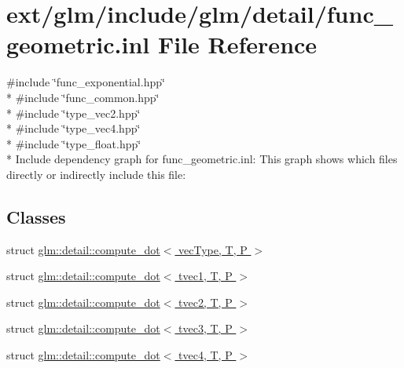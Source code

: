 \hypertarget{func__geometric_8inl}{\section{ext/glm/include/glm/detail/func\-\_\-geometric.inl File Reference}
\label{func__geometric_8inl}
}
{\ttfamily \#include \char`\"{}func\-\_\-exponential.\-hpp\char`\"{}}\\*
{\ttfamily \#include \char`\"{}func\-\_\-common.\-hpp\char`\"{}}\\*
{\ttfamily \#include \char`\"{}type\-\_\-vec2.\-hpp\char`\"{}}\\*
{\ttfamily \#include \char`\"{}type\-\_\-vec4.\-hpp\char`\"{}}\\*
{\ttfamily \#include \char`\"{}type\-\_\-float.\-hpp\char`\"{}}\\*
Include dependency graph for func\-\_\-geometric.\-inl\-:
This graph shows which files directly or indirectly include this file\-:
\subsection*{Classes}
\begin{DoxyCompactItemize}
\item 
struct \hyperlink{structglm_1_1detail_1_1compute__dot}{glm\-::detail\-::compute\-\_\-dot$<$ vec\-Type, T, P $>$}
\item 
struct \hyperlink{structglm_1_1detail_1_1compute__dot_3_01tvec1_00_01_t_00_01_p_01_4}{glm\-::detail\-::compute\-\_\-dot$<$ tvec1, T, P $>$}
\item 
struct \hyperlink{structglm_1_1detail_1_1compute__dot_3_01tvec2_00_01_t_00_01_p_01_4}{glm\-::detail\-::compute\-\_\-dot$<$ tvec2, T, P $>$}
\item 
struct \hyperlink{structglm_1_1detail_1_1compute__dot_3_01tvec3_00_01_t_00_01_p_01_4}{glm\-::detail\-::compute\-\_\-dot$<$ tvec3, T, P $>$}
\item 
struct \hyperlink{structglm_1_1detail_1_1compute__dot_3_01tvec4_00_01_t_00_01_p_01_4}{glm\-::detail\-::compute\-\_\-dot$<$ tvec4, T, P $>$}
\end{DoxyCompactItemize}
